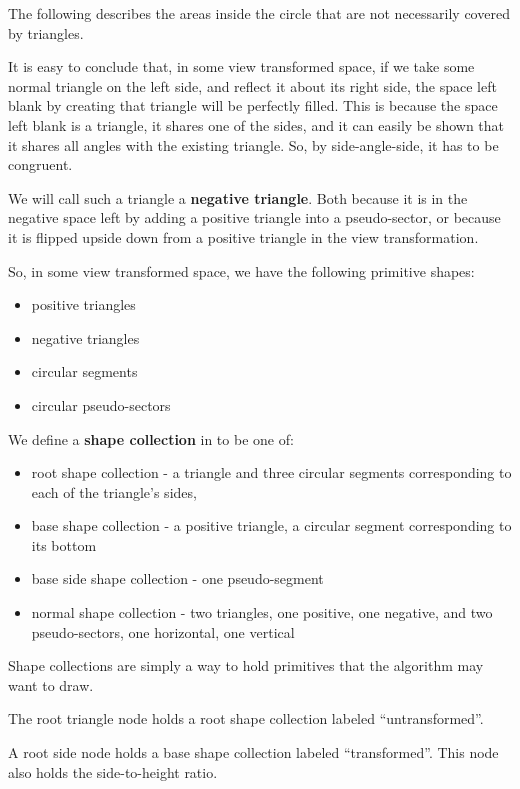 \documentclass[a4paper,12pt]{article}
\theoremstyle{definition}
\theoremstyle{plain}
\begin{document}
	The following describes the areas inside the circle that are not necessarily covered by triangles.
	
	It is easy to conclude that, in some view transformed space, if we
	take some normal triangle on the left side, and reflect it about its right side,
	the space left blank by creating that triangle will be perfectly filled.
	This is because the space left blank is a triangle, it shares one of the sides, and it can easily be shown
	that it shares all angles with the existing triangle. So, by side-angle-side, it has to be congruent.

	We will call such a triangle a \textbf{negative triangle}. Both because it is in the negative space
	left by adding a positive triangle into a pseudo-sector, or because it is flipped upside down from a
	positive triangle in the view transformation.

	So, in some view transformed space, we have the following primitive shapes: \begin{itemize}
		\item positive triangles
		\item negative triangles
		\item circular segments
		\item circular pseudo-sectors
	\end{itemize}

	We define a \textbf{shape collection} in to be one of:\begin{itemize}
		\item root shape collection -   a triangle and three circular segments corresponding to each of the triangle's sides,
		\item base shape collection -   a positive triangle, a circular segment corresponding to its bottom
		\item base side shape collection - one pseudo-segment
		\item normal shape collection - two triangles, one positive, one negative, and two pseudo-sectors, one horizontal, one vertical
	\end{itemize}

	Shape collections are simply a way to hold primitives that the algorithm may want to draw.

	The root triangle node holds a root shape collection labeled ``untransformed''.

	A root side node holds a base shape collection labeled ``transformed''. This node also holds the side-to-height ratio.
\end{document}
